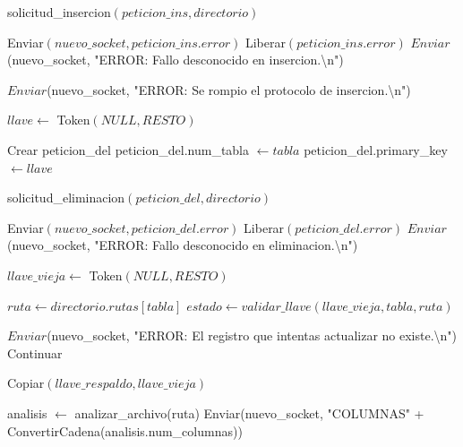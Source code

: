 \begin{tcolorbox}[colback=white, colframe=azul_unam, 
title=Pseudocódigo: servidor.c, breakable]
\begin{algorithmic}[1]
            \State solicitud\_insercion$(peticion\_ins, directorio)$

                \State Enviar$(nuevo\_socket, peticion\_ins.error)$
                \State Liberar$(peticion\_ins.error)$
            \Else
                \State $Enviar$(nuevo\_socket, "ERROR: Fallo desconocido en insercion.\textbackslash n")
            \EndIf

        \Else
            \State $Enviar$(nuevo\_socket, "ERROR: Se rompio el protocolo de insercion.\textbackslash n")
        \EndIf



        \State $llave \gets$ Token$(NULL, RESTO)$


            \State Crear peticion\_del
            \State peticion\_del.num\_tabla $\gets tabla$
            \State peticion\_del.primary\_key $\gets llave$

            \State solicitud\_eliminacion$(peticion\_del, directorio)$

                \State Enviar$(nuevo\_socket, peticion\_del.error)$
                \State Liberar$(peticion\_del.error)$
            \Else
                \State $Enviar$(nuevo\_socket, "ERROR: Fallo desconocido en eliminacion.\textbackslash n")
            \EndIf

        \EndIf



        \State $llave\_vieja \gets$ Token$(NULL, RESTO)$

        \State $ruta \gets directorio.rutas[tabla]$
        \State $estado \gets validar\_llave(llave\_vieja, tabla, ruta)$

            \State $Enviar$(nuevo\_socket, "ERROR: El registro que intentas actualizar no existe.\textbackslash n")
            \State Continuar
        \EndIf

        \State Copiar$(llave\_respaldo, llave\_vieja)$

        \State analisis $\gets$ analizar\_archivo(ruta)
        \State Enviar(nuevo\_socket, "COLUMNAS\textbar" + ConvertirCadena(analisis.num\_columnas))


\end{algorithmic}
\end{tcolorbox}
